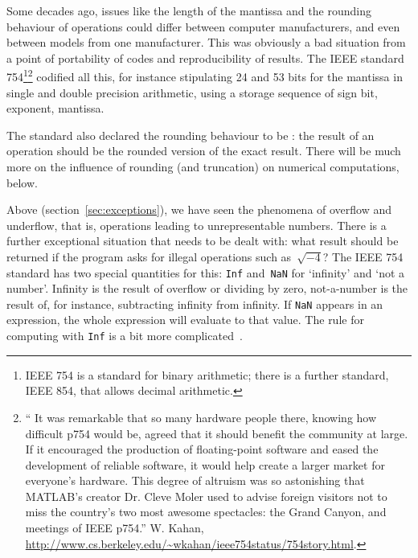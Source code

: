 Some decades ago, issues like the length of the
mantissa and the rounding behaviour of operations
could differ between computer manufacturers, and even between models
from one manufacturer. This was obviously a bad situation from a point
of portability of codes and reproducibility of results. The IEEE
standard 754\footnote{IEEE 754 is a standard for binary arithmetic;
  there is a further standard, IEEE 854, that allows decimal
  arithmetic.}\footnote{`` It was remarkable that so many hardware
  people there, knowing how difficult p754 would be, agreed that it
  should benefit the community at large. If it encouraged the
  production of floating-point software and eased the development of
  reliable software, it would help create a larger market for
  everyone's hardware. This degree of altruism was so astonishing that
  MATLAB's creator Dr. Cleve Moler used to advise foreign visitors not
  to miss the country's two most awesome spectacles: the Grand Canyon,
  and meetings of IEEE p754.'' W. Kahan,
  \url{http://www.cs.berkeley.edu/~wkahan/ieee754status/754story.html}.}
codified all this, for instance stipulating 24 and 53 bits for the
mantissa in single and double precision arithmetic,
using a storage sequence of sign bit, exponent, mantissa. 

The standard also declared the rounding behaviour
to be : the result of an operation should be the
rounded version of the exact result. There will be much more on the
influence of rounding (and truncation) on numerical computations, below.

Above (section~\ref{sec:exceptions}), we have seen the phenomena of
overflow and underflow, that is, operations leading to unrepresentable
numbers. There is a further exceptional situation that needs to be
dealt with: what result should be returned if the program asks for
illegal operations such as~$\sqrt{-4}$? The IEEE 754 standard has two
special quantities for this: \texttt{Inf} and~\texttt{NaN} for
`infinity' and `not a number'.  Infinity is the result of overflow or
dividing by zero, not-a-number is the result of, for instance,
subtracting infinity from infinity.  If \texttt{NaN} appears in an
expression, the whole expression will evaluate to that value. The rule
for computing with \texttt{Inf} is a bit more
complicated~\cite{goldberg:floatingpoint}.

